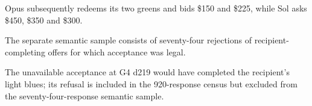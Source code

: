 
Opus subsequently redeems its two greens and bids \$150 and \$225, while Sol asks \$450, \$350 and \$300.

The separate semantic sample consists of seventy-four rejections of recipient-completing offers for which acceptance was legal.

The unavailable acceptance at G4 d219 would have completed the recipient's light blues; its refusal is included in the 920-response census but excluded from the seventy-four-response semantic sample.

